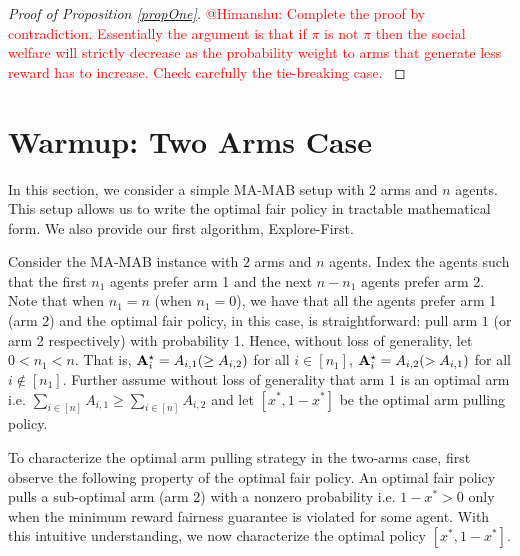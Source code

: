 \begin{proof}[Proof of Proposition \ref{propOne}]
\textcolor{red}{@Himanshu: Complete the proof by contradiction. Essentially the argument is that if $\pi$ is not $\pi$ then the social welfare will strictly decrease as the probability weight to arms that generate less reward has to increase. Check carefully the tie-breaking case.   }
\end{proof}
\fi 

\section{Warmup:  Two Arms Case}\label{sec:warmup}

In this section, we consider a simple MA-MAB setup with 2 arms and $n$ agents. This setup allows us to write the optimal fair policy in tractable mathematical form. We also provide our first algorithm, {\sc Explore-First}. 


Consider the MA-MAB instance with $2$ arms and $n $ agents.
Index the agents such that the first $ n_1$ agents prefer arm 1 and the next $n - n_1$ agents prefer arm 2. Note that when $n_1 = n$ (when $n_1 = 0$), we have that all the agents prefer arm 1 (arm 2) and the optimal fair policy, in this case, is straightforward: pull arm $1$ (or arm 2 respectively) with probability 1. Hence, without loss of generality, let $0 <   n_1 < n$. That is,  $ \mathbf{A}^{\star}_i  = A_{i,1} (\geq A_{i,2})$ for all $i \in [n_1]$, $ \mathbf{A}^{\star}_i  = A_{i,2} (> A_{i,1})$ for all $i \notin [n_1]$.  Further assume without loss of generality that arm $1$ is an optimal arm i.e. $\sum_{i \in [n]} A_{i,1} \geq \sum_{i \in [n]} A_{i,2} $ and let $[x^*, 1-x^*]$ be the optimal arm pulling policy. 

To characterize the optimal arm pulling strategy in the two-arms case,  first observe the following property of the optimal fair policy. An optimal fair policy pulls a sub-optimal arm (arm 2) with a nonzero  probability i.e. $1-x^* > 0$ only  when the minimum reward  fairness guarantee  is violated for some agent.   
With this intuitive understanding,  we now characterize the optimal policy $[x^*, 1-x^*]$. 

